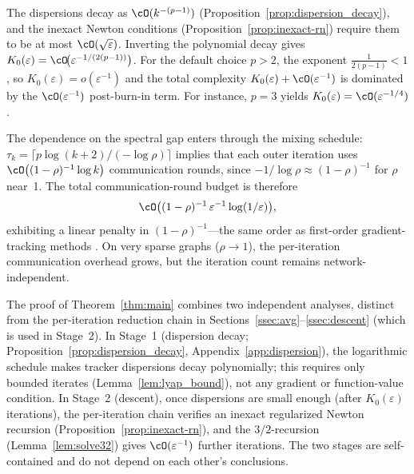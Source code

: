 \documentclass[review,onefignum,onetabnum]{siamart171218}
\begin{document}
	\begin{remark}\label{rem:burnin_order}
		The dispersions decay as $\cO(k^{-(p-1)})$
		(Proposition~\ref{prop:dispersion_decay}), and the inexact Newton
		conditions (Proposition~\ref{prop:inexact-rn}) require them to be at
		most $\cO(\sqrt\varepsilon)$.
		Inverting the polynomial decay gives
		$K_0(\varepsilon)=\cO\!\bigl(\varepsilon^{-1/(2(p-1))}\bigr)$.
		For the default choice $p>2$, the exponent $\frac{1}{2(p-1)}<1$, so
		$K_0(\varepsilon)=o(\varepsilon^{-1})$ and the total complexity
		$K_0(\varepsilon)+\cO(\varepsilon^{-1})$ is dominated by the
		$\cO(\varepsilon^{-1})$ post-burn-in term.
		For instance, $p=3$ yields
		$K_0(\varepsilon)=\cO(\varepsilon^{-1/4})$.
		
		The dependence on the spectral gap enters through the mixing schedule:
		$\tau_k=\lceil p\log(k+2)/(-\log\rho)\rceil$ implies that each
		outer iteration uses $\cO\bigl((1-\rho)^{-1}\log k\bigr)$
		communication rounds, since $-1/\log\rho\approx(1-\rho)^{-1}$ for
		$\rho$ near~1.
		The total communication-round budget is therefore
		\[
		\cO\bigl((1-\rho)^{-1}\,\varepsilon^{-1}\log(1/\varepsilon)\bigr),
		\]
		exhibiting a linear penalty in $(1-\rho)^{-1}$---the same
		order as first-order gradient-tracking methods
		\citep{nedic2017diging}.
		On very sparse graphs ($\rho\to 1$), the per-iteration communication
		overhead grows, but the iteration count remains network-independent.
	\end{remark}
	
	\begin{remark}\label{rem:two_stages}
		The proof of Theorem~\ref{thm:main} combines two independent
		analyses, distinct from the per-iteration reduction chain in
		Sections~\ref{ssec:avg}--\ref{ssec:descent} (which is used in Stage~2).
		In Stage~1 (dispersion decay;
		Proposition~\ref{prop:dispersion_decay},
		Appendix~\ref{app:dispersion}), the logarithmic schedule
		makes tracker dispersions decay polynomially; this requires only
		bounded iterates (Lemma~\ref{lem:lyap_bound}), not any gradient
		or function-value condition.
		In Stage~2 (descent), once dispersions are small enough
		(after $K_0(\varepsilon)$ iterations), the per-iteration chain
		verifies an inexact regularized Newton recursion
		(Proposition~\ref{prop:inexact-rn}), and the $3/2$-recursion
		(Lemma~\ref{lem:solve32}) gives $\cO(\varepsilon^{-1})$ further
		iterations.
		The two stages are self-contained and do not depend on each other's conclusions.
	\end{remark}
	
\end{document}
